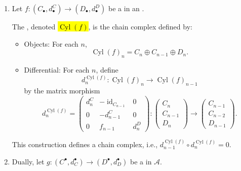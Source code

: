 \begin{definition} \label{definition:mapping_cylinder_of_a_map_of_chain_cochain_complexes}
    \begin{enumerate}
        \item Let $f : (C_\bullet, d^C_\bullet) \to (D_\bullet, d^D_\bullet)$ be a  in an .

        The , denoted \hl{$\operatorname{Cyl}(f)$}, is the chain complex defined by:
        \begin{itemize}
        \item Objects: For each $n$, 
        $$\operatorname{Cyl}(f)_n = C_n \oplus C_{n-1} \oplus D_n.$$
        \item Differential: For each $n$, define
        $$d^{\operatorname{Cyl}(f)}_n : \operatorname{Cyl}(f)_n \to \operatorname{Cyl}(f)_{n-1}$$
        by the matrix morphism
        $$d^{\operatorname{Cyl}(f)}_n = \begin{pmatrix} d^C_n & -\operatorname{id}_{C_{n-1}} & 0 \\ 0 & -d^C_{n-1} & 0 \\ 0 & f_{n-1} & d^D_n \end{pmatrix} : \begin{pmatrix} C_n \\ C_{n-1} \\ D_n \end{pmatrix} \to \begin{pmatrix} C_{n-1} \\ C_{n-2} \\ D_{n-1} \end{pmatrix}.$$
        \end{itemize}

        This construction defines a chain complex, i.e., $d^{\operatorname{Cyl}(f)}_{n-1} \circ d^{\operatorname{Cyl}(f)}_n = 0$.

        \item Dually, let $g : (C^\bullet, d_C^\bullet) \to (D^\bullet, d_D^\bullet)$ be a  in $\mathcal{A}$. 


\end{enumerate}
\end{definition}
